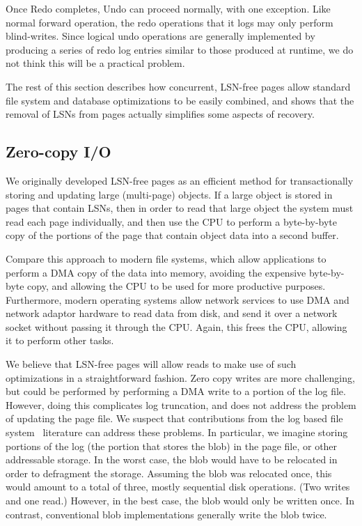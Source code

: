 \documentclass[letterpaper,twocolumn,10pt]{article}
\begin{document}
Once Redo completes, Undo can proceed normally, with one exception.
Like normal forward operation, the redo operations that it logs may
only perform blind-writes.  Since logical undo operations are
generally implemented by producing a series of redo log entries
similar to those produced at runtime, we do not think this will be a
practical problem.

The rest of this section describes how concurrent, LSN-free pages 
allow standard file system and database optimizations to be easily
combined, and shows that the removal of LSNs from pages actually
simplifies some aspects of recovery.

\subsection{Zero-copy I/O} 

We originally developed LSN-free pages as an efficient method for
transactionally storing and updating large (multi-page) objects.  If a
large object is stored in pages that contain LSNs, then in order to
read that large object the system must read each page individually,
and then use the CPU to perform a byte-by-byte copy of the portions of
the page that contain object data into a second buffer.

Compare this approach to modern file systems, which allow applications to
perform a DMA copy of the data into memory, avoiding the expensive
byte-by-byte copy, and allowing the CPU to be used for
more productive purposes.  Furthermore, modern operating systems allow
network services to use DMA and network adaptor hardware to read data
from disk, and send it over a network socket without passing it
through the CPU.  Again, this frees the CPU, allowing it to perform
other tasks.

We believe that LSN-free pages will allow reads to make use of such
optimizations in a straightforward fashion.  Zero copy writes are more challenging, but could be
performed by performing a DMA write to a portion of the log file.
However, doing this complicates log truncation, and does not address
the problem of updating the page file.  We suspect that contributions
from the log based file system~\cite{lfs} literature can address these problems.
In particular, we imagine storing 
portions of the log (the portion that stores the blob) in the 
page file, or other addressable storage.  In the worst case, 
the blob would have to be relocated in order to defragment the 
storage.  Assuming the blob was relocated once, this would amount 
to a total of three, mostly sequential disk operations.  (Two 
writes and one read.)  However, in the best case, the blob would only be written once.
In contrast, conventional blob implementations generally write the blob twice. 
\end{document}
